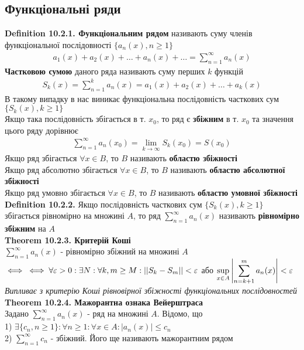 \documentclass[a4paper, 14pt]{extarticle}
\def\huge{\displaystyle}
\def\bigline{\vspace{5mm}\\}
\def\defin#1{\textbf{Definition {#1}}}
\def\th#1{\textbf{Theorem {#1}}}
\def\bigline{\vspace{5mm}\\}
\begin{document}
\subsection{Функціональні ряди}
\defin{10.2.1. Функціональним рядом} називають суму членів функціональної послідовності $\{a_n(x), n \geq 1\}$
\begin{align*}
a_1(x) + a_2(x) + \dots + a_n(x) + \dots = \huge \sum_{n=1}^\infty a_n(x)
\end{align*}
\textbf{Частковою сумою} даного ряда називають суму перших $k$ функцій
\begin{align*}
S_k(x) = \sum_{n=1}^k a_n(x) = a_1(x) + a_2(x) + \dots + a_k(x)
\end{align*}
В такому випадку в нас виникає функціональна послідовність часткових сум $\{S_k(x), k \geq 1\}$\\
Якщо така послідовність збігається в т. $x_0$, то ряд є \textbf{збіжним} в т. $x_0$ та значення цього ряду дорівнює
\begin{align*}
\sum_{n=1}^\infty a_n(x_0) = \lim_{k \to \infty} S_k(x_0) = S(x_0)
\end{align*}
Якщо ряд збігається $\forall x \in B$, то $B$ називають \textbf{областю збіжності}
\bigline
Якщо ряд абсолютно збігається $\forall x \in B$, то $B$ називають \textbf{областю абсолютної збіжності}
\bigline
Якщо ряд умовно збігається $\forall x \in B$, то $B$ називають \textbf{областю умовної збіжності}
\bigline
\defin{10.2.2.} Якщо послідовність часткових сум $\{S_k(x), k \geq 1\}$ збігається рівномірно на множині $A$, то ряд $\huge \sum_{n=1}^\infty a_n(x)$ називають \textbf{рівномірно збіжним} на $A$
\bigline
\th{10.2.3. Критерій Коші}\\
$\huge \sum_{n=1}^\infty a_n(x)$ - рівномірно збіжний на множині $A$ $\iff \\ \iff \forall \varepsilon > 0: \exists N: \forall k,m \geq M: ||S_k - S_m|| < \varepsilon$ або $\huge \sup_{x \in A} \abs{\sum_{n=k+1}^m a_n(x)} < \varepsilon$\\
\textit{Випливає з критерію Коші рівновірної збіжності функціональних послідовностей}
\bigline
\th{10.2.4. Мажорантна ознака Вейерштраса}\\
Задано $\huge \sum_{n=1}^\infty a_n(x)$ - ряд на множині $A$. Відомо, що\\
1) $\exists \{c_n, n \geq 1\}: \forall n \geq 1: \forall x \in A: |a_n(x)| \leq c_n$\\
2) $\huge \sum_{n=1}^\infty c_n$ - збіжний. Його ще називають мажорантним рядом\\
\end{document}
